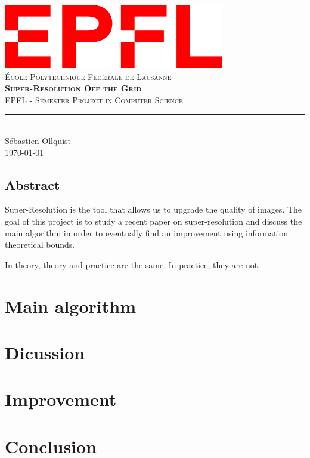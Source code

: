 \documentclass[11pt,titlepage]{report}
\begin{document}
\begin{titlepage}
	\centering
    \includegraphics[width=0.5\linewidth]{images/EPFL.png}\\[0.25cm] 	%
    \textsc{\LARGE École Polytechnique Fédérale de Lausanne}\\ \vspace{\fill}
    \textbf{\textsc{\fontsize{30}{30}\selectfont Super-Resolution Off the Grid}}\\ \vspace{\fill}		
	\textsc{\LARGE EPFL - Semester Project in Computer Science}\\[0.4cm]
	\rule{\linewidth}{0.2 mm} \\[0.5 cm]
	Sébastien Ollquist \\[2cm] \today
\end{titlepage}
\restoregeometry

\thispagestyle{numberonly}
\begin{summary}
\section*{Abstract}
Super-Resolution is the tool that allows us to upgrade the quality of images. The goal of this project is to study a recent paper on super-resolution and discuss the main algorithm in order to eventually find an improvement using information theoretical bounds.
\end{summary}

\begin{fquote}
    In theory, theory and practice are the same. In practice, they are not.
\end{fquote}






\chapter{Main algorithm}

\chapter{Dicussion}

\chapter{Improvement}

\chapter{Conclusion}

\appendix


\clearpage
\pagestyle{numberonly}
\printbibliography
\end{document}
